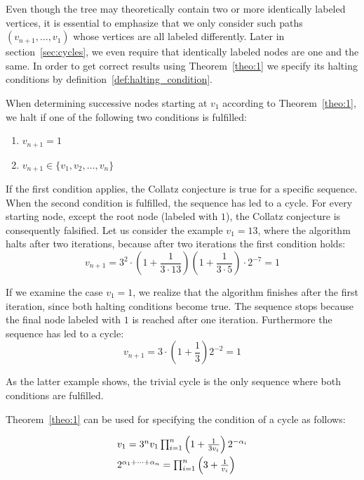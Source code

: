 Even though the tree may theoretically contain two or more identically labeled vertices, it is essential to emphasize that we only consider such paths $(v_{n+1},\ldots,v_1)$ whose vertices are all labeled differently. Later in section~\ref{sec:cycles}, we even require that identically labeled nodes are one and the same. In order to get correct results using Theorem~\ref{theo:1} we specify its halting conditions by definition~\ref{def:halting_condition}.

\begin{definition}
	\label{def:halting_condition}
	When determining successive nodes starting at $v_1$ according to Theorem~\ref{theo:1}, we halt if one of the following two conditions is fulfilled:
	\begin{enumerate}
		\item $v_{n+1}=1$
		\item $v_{n+1}\in\{v_1,v_2,\ldots,v_n\}$
	\end{enumerate}
	If the first condition applies, the Collatz conjecture is true for a specific sequence. When the second condition is fulfilled, the sequence has led to a cycle. For every starting node, except the root node (labeled with $1$), the Collatz conjecture is consequently falsified. Let us consider the example $v_1=13$, where the algorithm halts after two iterations, because after two iterations the first condition holds:
	\[
	v_{n+1}=3^2\cdot\left(1+\frac{1}{3\cdot13}\right)\left(1+\frac{1}{3\cdot5}\right)\cdot2^{-7}=1
	\]
	
	If we examine the case $v_{1}=1$, we realize that the algorithm finishes after the first iteration, since both halting conditions become true. The sequence stops because the final node labeled with $1$ is reached after one iteration. Furthermore the sequence has led to a cycle:
	\[
	v_{n+1}=3\cdot\left(1+\frac{1}{3}\right)2^{-2}=1
	\]
	
	As the latter example shows, the trivial cycle is the only sequence where both conditions are fulfilled.
\end{definition}

\noindent
Theorem~\ref{theo:1} can be used for specifying the condition of a cycle as follows:

\begin{equation}
\label{eq:func_cycle}
\begin{array}{l}
v_{1}=3^nv_1\prod_{i=1}^{n}\left(1+\frac{1}{3v_i}\right)2^{-\alpha_i}
\\[\medskipamount]
2^{\alpha_1+\cdots+\alpha_n}=\prod_{i=1}^{n}\left(3+\frac{1}{v_i}\right)
\end{array}
\end{equation}

